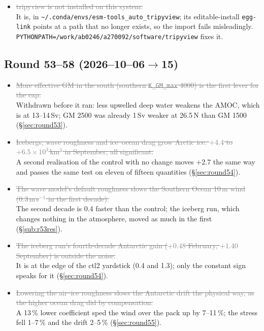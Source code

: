 \documentclass[10pt]{article}
\newcommand{\dead}[1]{\textcolor{gray}{\sout{#1}}}
\begin{document}
\begin{itemize}
\item \dead{tripyview is not installed on this system.} \\ It is, in
      \texttt{\textasciitilde/.conda/envs/esm-tools\_auto\_tripyview}; its editable-install
      \texttt{egg-link} points at a path that no longer exists, so the import fails
      misleadingly. \texttt{PYTHONPATH=/work/ab0246/a270092/software/tripyview} fixes it.

\end{itemize}

\subsection{Round 53--58 (2026--10--06$\to$15)}\label{sub:fals5358}

\begin{itemize}

\item \dead{More effective GM in the south (southern \texttt{K\_GM\_max} 4000) is the first lever for the
      cap.} \\ Withdrawn before it ran: less upwelled deep water weakens the AMOC, which is at 13--14\,Sv;
      GM 2500 was already 1\,Sv weaker at 26.5\,N than GM 1500 (\S\ref{sec:round53}).

\item \dead{Icebergs, wave roughness and ice--ocean drag grow Arctic ice: $+4.4$ to $+6.5\times10^3$\,km$^3$
      in September, all significant.} \\ A second realisation of the control with no change moves
      $+2.7$ the same way and passes the same test on eleven of fifteen quantities
      (\S\ref{sec:round54}).

\item \dead{The wave model's default roughness slows the Southern Ocean 10\,m wind (0.3\,m\,s$^{-1}$ in
      the first decade).} \\ The second decade is 0.4 faster than the control; the iceberg run, which
      changes nothing in the atmosphere, moved as much in the first (\S\ref{sub:r53res}).

\item \dead{The iceberg run's fourth-decade Antarctic gain ($+0.48$ February, $+1.40$ September) is
      outside the noise.} \\ It is at the edge of the ctl2 yardstick (0.4 and 1.3); only the constant
      sign speaks for it (\S\ref{sec:round54}).

\item \dead{Lowering the air--ice roughness slows the Antarctic drift the physical way, as the higher
      ocean drag did by compensation.} \\ A 13\,\% lower coefficient sped the wind over the pack up by
      7--11\,\%; the stress fell 1--7\,\% and the drift 2--5\,\% (\S\ref{sec:round55}).


\end{itemize}
\end{document}

